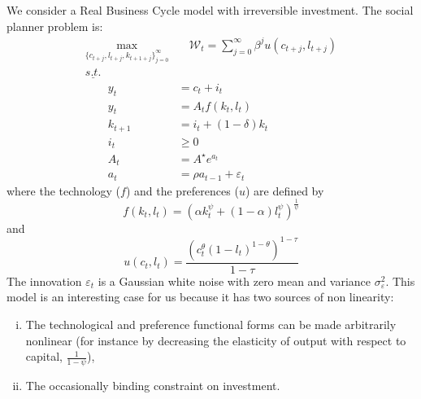 \documentclass[a4paper,12pt]{amsart}
\begin{document}
We consider a Real Business Cycle model with irreversible investment. The social planner problem is:
\begin{equation*}
   \begin{split}
      \max_{\{c_{t+j},l_{t+j},k_{t+1+j}\}_{j=0}^{\infty}} & \quad \mathcal W_t = \sum_{j=0}^{\infty}\beta^ju(c_{t+j},l_{t+j}) \\
      \underline{s.t.}                                    &                                                                   \\
      \qquad y_t                                          & = c_t + i_t                                                       \\
      \qquad y_t                                          & = A_tf(k_t,l_t)                                                   \\
      \qquad k_{t+1}                                      & = i_t + (1-\delta)k_t                                             \\
      \qquad i_t                                          & \geq 0                                                            \\
      \qquad A_{t}                                        & = {A^{\star}}e^{a_{t}}                                            \\
      \qquad a_{t}                                        & = \rho a_{t-1} + \varepsilon_t
   \end{split}
\end{equation*}
where the technology ($f$) and the preferences ($u$) are defined by
\begin{equation*}
   f(k_t,l_t) = \left(\alpha k_t^{\psi} + (1-\alpha)l_t^{\psi}\right)^{\frac{1}{\psi}}
\end{equation*}
and
\begin{equation*}
   u(c_t,l_t) = \frac{\left(c_t^{\theta}(1-l_t)^{1-\theta}\right)^{1-\tau}}{1-\tau}
\end{equation*}
The innovation $\varepsilon_t$ is a Gaussian white noise with zero mean and
variance $\sigma_{\varepsilon}^2$. This model is an interesting case for
us because it has two sources of non linearity:
\begin{enumerate}[(i)]
   \item The technological and preference functional forms can be made arbitrarily nonlinear (for instance by decreasing the elasticity of output with respect to capital, $\frac{1}{1-\psi}$),
   \item The occasionally binding constraint on investment.
\end{enumerate}
\end{document}
